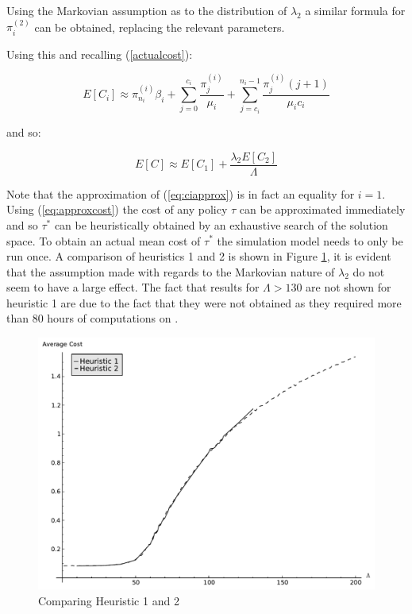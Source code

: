 \documentclass[12pt]{article}
\begin{document}
Using the Markovian assumption as to the distribution of $\lambda_2$ a similar formula for $\pi_i^{(2)}$ can be obtained, replacing the relevant parameters.

Using this and recalling (\ref{actualcost}):

\begin{equation}\label{eq:ciapprox}
E[C_{i}] \approx \pi_{n_i}^{(i)} \beta_{i} + \sum_{j=0}^{c_{i}} \frac{\pi_{j}^{(i)}}{\mu_{i}} + \sum_{j=c_{i}}^{n_i-1}\frac{ \pi_{j}^{(i)}(j+1)}{ \mu_{i} c_{i}}
\end{equation}

and so:

\begin{equation}\label{eq:approxcost}
E[C]\approx E[C_1] + \frac{\lambda_2E[C_2]}{\Lambda}
\end{equation}

Note that the approximation of (\ref{eq:ciapprox}) is in fact an equality for $i=1$.
Using (\ref{eq:approxcost}) the cost of any policy $\tau$ can be approximated immediately and so $\tau^*$ can be heuristically obtained by an exhaustive search of the solution space.
To obtain an actual mean cost of $\tau^*$ the simulation model needs to only be run once.
A comparison of heuristics 1 and 2 is shown in Figure \ref{casestudycomp}, it is evident that the assumption made with regards to the Markovian nature of $\lambda_2$ do not seem to have a large effect.
The fact that results for $\Lambda >130$ are not shown for heuristic 1 are due to the fact that they were not obtained as they required more than 80 hours of computations on \cite{web002}.

\begin{figure}[!hbtp]
    \begin{center}
        \includegraphics[width=.6\textwidth]{Images/CaseStudyComp.pdf}
    \end{center}
    \caption{Comparing Heuristic 1 and 2}\label{casestudycomp}
\end{figure}
\end{document}

